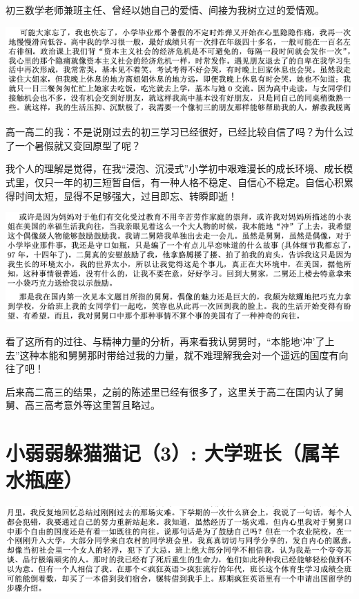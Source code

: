 \documentclass[9pt, b5paper]{article}
\begin{document}
初三数学老师兼班主任、曾经以她自己的爱情、间接为我树立过的爱情观。

\begin{center}
\includegraphics[width=.9\linewidth]{./pic/backups_plans_20210422_171522.png}
\end{center}

高一高二的我：不是说刚过去的初三学习已经很好，已经比较自信了吗？为什么过了一个暑假就又变回原型了呢？

我个人的理解是觉得，在我“浸泡、沉浸式”小学初中艰难漫长的成长环境、成长模式里，仅只一年的初三短暂自信，有一种人格不稳定、自信心不稳定。自信心积累得时间太短，显得不足够强大，过目即忘、转瞬即逝！

\begin{center}
\includegraphics[width=.9\linewidth]{./pic/readme_20210422_172512.png}
\end{center}

看了这所有的过往、与精神力量的分析，再来看我认舅舅时，“本能地‘冲’了上去”这种本能和舅舅那时带给过我的力量，就不难理解我会对一个遥远的国度有向往了吧！

后来高二高三的结果，之前的陈述里已经有很多了，这里关于高二在国内认了舅舅、高三高考意外等这里暂且略过。

\section{小弱弱躲猫猫记（3）: 大学班长（属羊水瓶座）}
\label{sec:orgad5e78b}

\begin{center}
\includegraphics[width=.9\linewidth]{./pic/backups_plans_20210422_095651.png}
\end{center}
\end{document}
